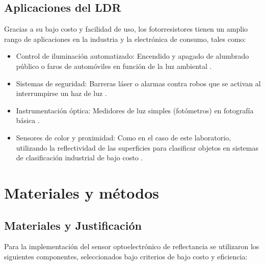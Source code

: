 \documentclass[conference]{IEEEtran}
\begin{document}
\subsection{Aplicaciones del LDR}
Gracias a su bajo costo y facilidad de uso, los fotorresistores tienen un amplio rango de aplicaciones en la industria y la electrónica de consumo, tales como:
\begin{itemize}
    \item Control de iluminación automatizado: Encendido y apagado de alumbrado público o faros de automóviles en función de la luz ambiental \cite{ldr_12}.
    \item Sistemas de seguridad: Barreras láser o alarmas contra robos que se activan al interrumpirse un haz de luz \cite{ldr_13}.
    \item Instrumentación óptica: Medidores de luz simples (fotómetros) en fotografía básica \cite{ldr_14}.
    \item Sensores de color y proximidad: Como en el caso de este laboratorio, utilizando la reflectividad de las superficies para clasificar objetos en sistemas de clasificación industrial de bajo costo \cite{ldr_15}.
\end{itemize}

\section{Materiales y métodos}
\subsection{Materiales y Justificación}
Para la implementación del sensor optoelectrónico de reflectancia se utilizaron los siguientes componentes, seleccionados bajo criterios de bajo costo y eficiencia:
\end{document}
